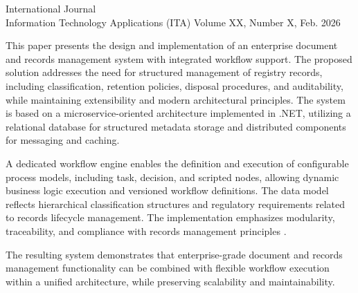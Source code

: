 \documentclass{article}
\begin{document}
\ITAjournalhead
  {International Journal\\Information Technology Applications (ITA)}
  {Volume XX, Number X, Feb. 2026}


\begin{ITAabstract}
This paper presents the design and implementation of an enterprise document and records management system with integrated workflow support. 
The proposed solution addresses the need for structured management of registry records, including classification, retention policies, disposal procedures, and auditability, 
while maintaining extensibility and modern architectural principles. 
The system is based on a microservice-oriented architecture implemented in .NET, utilizing a relational database for structured metadata storage and distributed components for messaging and caching. 

A dedicated workflow engine enables the definition and execution of configurable process models, including task, decision, and scripted nodes, allowing dynamic business logic execution and versioned workflow definitions. 
The data model reflects hierarchical classification structures and regulatory requirements related to records lifecycle management. 
The implementation emphasizes modularity, traceability, and compliance with records management principles \cite{iso15489,moreq2010}.

The resulting system demonstrates that enterprise-grade document and records management functionality can be combined with flexible workflow execution within a unified architecture, 
while preserving scalability and maintainability.
\end{ITAabstract}



\setcounter{section}{0}








\clearpage



\end{document}
